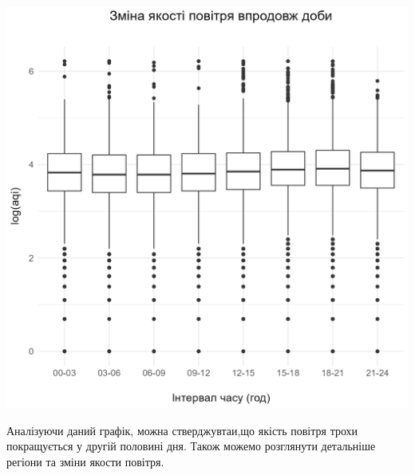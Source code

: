 \documentclass{article}
\begin{document}
\begin{enumerate}
    \begin{center}
    \includegraphics[width=6in]{plots/question3/box.png}
    \end{center}
    Аналізуючи даний графік, можна стверджувтаи,що якість повітря трохи покращується у другій половині дня.
    Також можемо розглянути детальніше регіони та зміни якости повітря. 
    

\end{enumerate}
\end{document}
